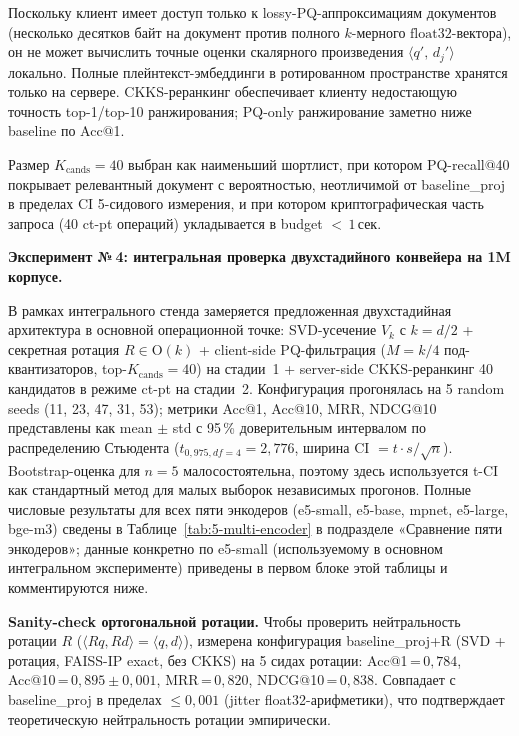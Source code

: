 \documentclass[a4paper, 12pt, oneside, openany]{article}
\begin{document}
Поскольку клиент имеет доступ только к lossy-PQ-аппроксимациям документов (несколько десятков байт на документ против полного $k$-мерного $\mathrm{float32}$-вектора), он не может вычислить точные оценки скалярного произведения $\langle q',\,d_j'\rangle$ локально. Полные плейнтекст-эмбеддинги в ротированном пространстве хранятся только на сервере. CKKS-реранкинг обеспечивает клиенту недостающую точность top-1/top-10 ранжирования; PQ-only ранжирование заметно ниже baseline по Acc@1.

Размер $K_{\mathrm{cands}} = 40$ выбран как наименьший шортлист, при котором PQ-recall@40 покрывает релевантный документ с вероятностью, неотличимой от baseline\_proj в пределах CI 5-сидового измерения, и при котором криптографическая часть запроса (40 ct-pt операций) укладывается в budget $<\,1$\,сек.

\textbf{Эксперимент №\,4: интегральная проверка двухстадийного конвейера на 1M корпусе.}

В рамках интегрального стенда замеряется предложенная двухстадийная архитектура в основной операционной точке: SVD-усечение $V_k$ с $k = d/2$ + секретная ротация $R \in \mathrm{O}(k)$ + client-side PQ-фильтрация ($M = k/4$ под-квантизаторов, top-$K_{\mathrm{cands}} = 40$) на стадии~1 + server-side CKKS-реранкинг 40 кандидатов в режиме ct-pt на стадии~2. Конфигурация прогонялась на 5 random seeds (11, 23, 47, 31, 53); метрики Acc@1, Acc@10, MRR, NDCG@10 представлены как mean $\pm$ std с 95\,\% доверительным интервалом по распределению Стьюдента ($t_{0{,}975, df=4} = 2{,}776$, ширина CI $= t \cdot s/\sqrt{n}$). Bootstrap-оценка для $n = 5$ малосостоятельна, поэтому здесь используется t-CI как стандартный метод для малых выборок независимых прогонов. Полные числовые результаты для всех пяти энкодеров (e5-small, e5-base, mpnet, e5-large, bge-m3) сведены в Таблице~\ref{tab:5-multi-encoder} в подразделе «Сравнение пяти энкодеров»; данные конкретно по e5-small (используемому в основном интегральном эксперименте) приведены в первом блоке этой таблицы и комментируются ниже.

\textbf{Sanity-check ортогональной ротации.} Чтобы проверить нейтральность ротации $R$ ($\langle Rq, Rd\rangle = \langle q, d\rangle$), измерена конфигурация baseline\_proj+R (SVD + ротация, FAISS-IP exact, без CKKS) на 5 сидах ротации: Acc@1\,=\,$0{,}784$, Acc@10\,=\,$0{,}895 \pm 0{,}001$, MRR\,=\,$0{,}820$, NDCG@10\,=\,$0{,}838$. Совпадает с baseline\_proj в пределах $\leq 0{,}001$ (jitter float32-арифметики), что подтверждает теоретическую нейтральность ротации эмпирически.
\end{document}

